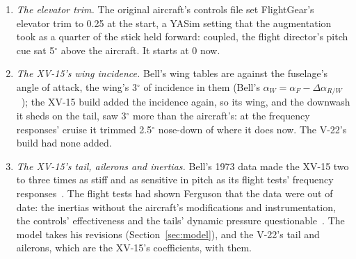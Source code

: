 \documentclass[10pt,a4paper,twocolumn]{article}
\begin{document}
\begin{enumerate}
\item \emph{The elevator trim.} The original aircraft's controls file set FlightGear's elevator trim to 0.25 at the start, a YASim setting
that the augmentation took as a quarter of the stick held forward: coupled, the flight director's pitch cue sat 5$^\circ$ above the
aircraft. It starts at 0 now.
\item \emph{The XV-15's wing incidence.} Bell's wing tables are against the fuselage's angle of attack, the wing's 3$^\circ$ of incidence in them
(Bell's $\alpha_W = \alpha_F - \Delta\alpha_{R/W}$~\cite{cr}); the XV-15 build added the incidence again, so its wing, and the downwash it sheds on
the tail, saw 3$^\circ$ more than the aircraft's: at the frequency responses' cruise it trimmed 2.5$^\circ$ nose-down of where it does now. The V-22's
build had none added.
\item \emph{The XV-15's tail, ailerons and inertias.} Bell's 1973 data made the XV-15 two to three times as stiff and as sensitive in pitch as its
flight tests' frequency responses~\cite{tt}. The flight tests had shown Ferguson that the data were out of date: the inertias without the aircraft's
modifications and instrumentation, the controls' effectiveness and the tails' dynamic pressure questionable~\cite{gt}. The model takes his revisions
(Section~\ref{sec:model}), and the V-22's tail and ailerons, which are the XV-15's coefficients, with them.
\end{enumerate}

\end{document}
